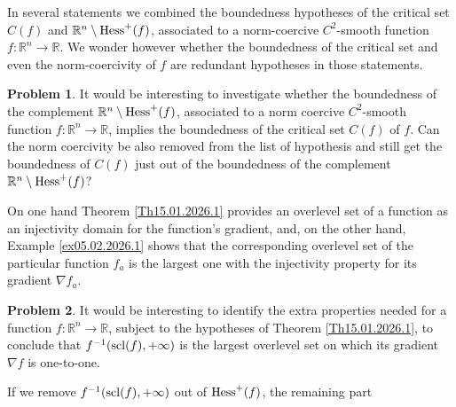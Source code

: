 \documentclass[12pt,twoside,reqno]{amsart}
\theoremstyle{definition}
\newtheorem{problem}{Problem}[section]
\numberwithin{equation}{section}
\begin{document}
In several statements we combined the boundedness hypotheses of the critical set $C(f)$ and $\mathbb{R}^n\setminus {\rm Hess}^+(f)$, associated to a norm-coercive $C^2$-smooth function $f:\mathbb{R}^n\longrightarrow\mathbb{R}$. We wonder however whether the boundedness of the critical set and even the norm-coercivity of $f$ are redundant hypotheses in those statements. 
\begin{problem}\label{Prob01.02.2026.1}It would be interesting to investigate whether the boundedness of  the complement $\mathbb{R}^n\setminus {\rm Hess}^+(f)$, associated to a norm coercive $C^2$-smooth function $f:\mathbb{R}^n\longrightarrow\mathbb{R}$, implies the boundedness of the critical set $C(f)$ of $f$. Can the norm coercivity be also removed from the list of hypothesis and still get the boundedness of $C(f)$ just out of the boundedness of the complement  $\mathbb{R}^n\setminus {\rm Hess}^+(f)$?
\end{problem}

On one hand Theorem \ref{Th15.01.2026.1} provides an overlevel set of a function as an injectivity domain for the function's gradient, and, on the other hand, Example \ref{ex05.02.2026.1} shows that the corresponding overlevel set of the particular function $f_a$ is the largest one with the injectivity property for its gradient $\nabla f_a$.
\begin{problem}
It would be interesting to identify the extra properties needed for a function    $f:\mathbb{R}^n\longrightarrow\mathbb{R}$, subject to the hypotheses of Theorem \ref{Th15.01.2026.1}, to conclude that $f^{-1}({\rm scl}(f),+\infty)$ is the largest overlevel set on which its gradient $\nabla f$ is one-to-one.
\end{problem}
If we remove $f^{-1}({\rm scl}(f),+\infty)$ out of ${\rm Hess}^+(f)$, the remaining part 
\end{document}
